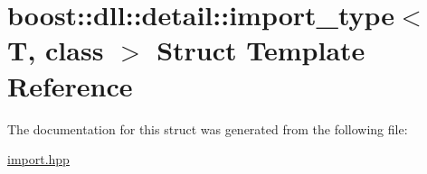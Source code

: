 \hypertarget{a00152}{}\section{boost\+:\+:dll\+:\+:detail\+:\+:import\+\_\+type$<$ T, class $>$ Struct Template Reference}
\label{a00152}


The documentation for this struct was generated from the following file\+:\begin{DoxyCompactItemize}
\item 
\hyperlink{a00570}{import.\+hpp}\end{DoxyCompactItemize}
